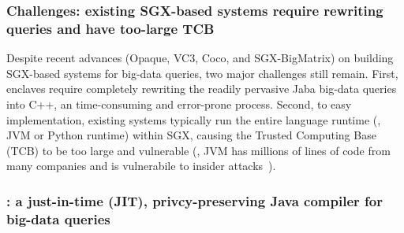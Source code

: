 \subsubsection{Challenges: existing SGX-based systems require rewriting 
queries and have too-large TCB} 
\label{sec:ift-problem}\vspace{-.075in}

Despite recent advances (Opaque, VC3, Coco, and SGX-BigMatrix) on building 
SGX-based systems for big-data queries, two major challenges still remain. 
First, enclaves require completely rewriting the readily pervasive Jaba 
big-data queries into C++, an time-consuming and error-prone process. 
Second, to easy implementation, existing systems typically run the entire 
language runtime (\eg, JVM or Python runtime) within SGX, causing the Trusted 
Computing Base (TCB) to be too large and vulnerable (\eg, JVM has millions of 
lines of code from many companies and is vulnerabile to insider 
attacks~\cite{top-threats}).

\vspace{-.15in}
\subsubsection{\maat: a just-in-time (JIT), privcy-preserving Java compiler for 
big-data queries} 
\label{sec:ift-problem}\vspace{-.075in}

